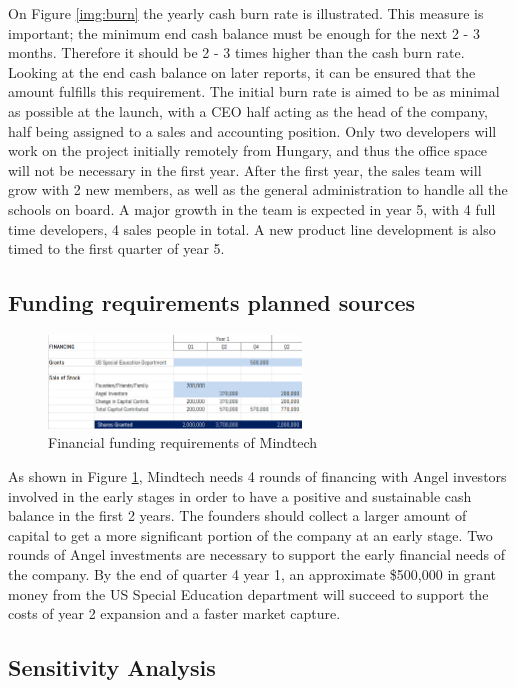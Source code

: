\documentclass[letterpaper,10pt]{article}
\let\oldsubsection\subsection
\renewcommand{\subsection}{\def\cursectioning{subsection}\oldsubsection}
\begin{document}
On Figure \ref{img:burn} the yearly cash burn rate is illustrated. This measure is important; the minimum end cash balance must be enough for the next 2 - 3 months. Therefore it should be 2 - 3 times higher than the cash burn rate. Looking at the end cash balance on later reports, it can be ensured that the amount fulfills this requirement. The initial burn rate is aimed to be as minimal as possible at the launch, with a CEO half acting as the head of the company, half being assigned to a sales and accounting position. Only two developers will work on the project initially remotely from Hungary, and thus the office space will not be necessary in the first year. After the first year, the sales team will grow with 2 new members, as well as the general administration to handle all the schools on board. A major growth in the team is expected in year 5, with 4 full time developers, 4 sales people in total. A new product line development is also timed to the first quarter of year 5.

\subsection{Funding requirements planned sources}

\begin{figure}
\centering
\includegraphics[width=0.6\textwidth]{financing.PNG}
\caption{Financial funding requirements of Mindtech}
\label{img:financials}
\end{figure}


As shown in Figure \ref{img:financials}, Mindtech needs 4 rounds of financing with Angel investors involved in the early stages in order to have a positive and sustainable cash balance in the first 2 years. The founders should collect a larger amount of capital to get a more significant portion of the company at an early stage. Two rounds of Angel investments are necessary to support the early financial needs of the company. By the end of quarter 4 year 1, an approximate \$500,000 in grant money from the US Special Education department will succeed to support the costs of year 2 expansion and a faster market capture.

\subsection{Sensitivity Analysis}
\end{document}
